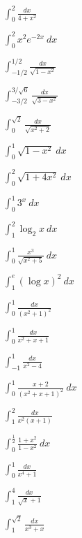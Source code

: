 \documentclass[11pt, uplatex, dvipdfmx]{jsarticle}
\newcommand{\ds}{\displaystyle}
\begin{document}
\begin{edaenumerate}
  \item $\ds \int_{0}^{2} \frac{dx}{4+x^2}$

  \item $\ds \int_{0}^{2} x^2 e^{-2x} \ dx$

  \item $\ds \int_{-1/2}^{1/2} \frac{dx}{\sqrt{1-x^2}}$

  \item $\ds \int_{-3/2}^{3/\sqrt{6}} \frac{dx}{\sqrt{3-x^2}}$

  \item $\ds \int_{0}^{\sqrt{2}} \frac{dx}{\sqrt{x^2+2}}$

  \item $\ds \int_{0}^{1} \sqrt{1-x^2} \ dx$

  \item $\ds \int_{0}^{2} \sqrt{1+4x^2} \ dx$

  \item $\ds \int_{0}^{1} 3^x \ dx$

  \item $\ds \int_{1}^{2} \log_2 x \ dx$

  \item $\ds \int_{0}^{1} \frac{x^3}{\sqrt{x^2+5}} \ dx$

  \item $\ds \int_1^e \left( \log x \right)^2 \ dx$

  \item $\ds \int_{0}^{1} \frac{dx}{(x^2+1)^2}$

  \item $\ds \int_{0}^{1} \frac{dx}{x^2+x+1}$

  \item $\ds \int_{-1}^{1} \frac{dx}{x^2-4}$

  \item $\ds \int_{0}^{1} \frac{x+2}{(x^2+x+1)^2} \ dx$

  \item $\ds \int_{1}^{2} \frac{dx}{x^2(x+1)}$

  \item $\ds \int_{0}^{\frac{1}{2}} \frac{1+x^2}{1-x^2} \ dx$

  \item $\ds \int_{0}^{1} \frac{dx}{x^4+1}$

  \item $\ds \int_{1}^{4} \frac{dx}{\sqrt{x}+1}$

  \item $\ds \int_{1}^{\sqrt{2}} \frac{dx}{x^3+x}$


\end{edaenumerate}
\end{document}

